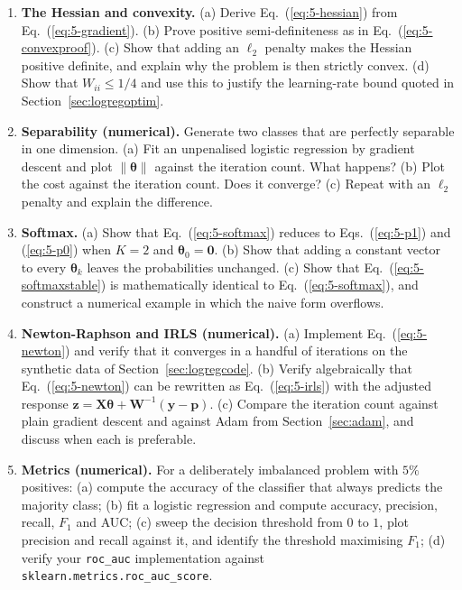 \begin{enumerate}
\item \textbf{The Hessian and convexity.}
  (a) Derive Eq.~(\ref{eq:5-hessian}) from Eq.~(\ref{eq:5-gradient}).
  (b) Prove positive semi-definiteness as in Eq.~(\ref{eq:5-convexproof}).
  (c) Show that adding an $\ell_2$ penalty makes the Hessian positive
      definite, and explain why the problem is then strictly convex.
  (d) Show that $W_{ii}\le 1/4$ and use this to justify the learning-rate
      bound quoted in Section~\ref{sec:logregoptim}.

\item \textbf{Separability (numerical).}
  Generate two classes that are perfectly separable in one dimension.
  (a) Fit an unpenalised logistic regression by gradient descent and plot
      $\|\bm{\theta}\|$ against the iteration count.  What happens?
  (b) Plot the cost against the iteration count.  Does it converge?
  (c) Repeat with an $\ell_2$ penalty and explain the difference.

\item \textbf{Softmax.}
  (a) Show that Eq.~(\ref{eq:5-softmax}) reduces to
      Eqs.~(\ref{eq:5-p1}) and (\ref{eq:5-p0}) when $K=2$ and
      $\bm{\theta}_0=\bm{0}$.
  (b) Show that adding a constant vector to every $\bm{\theta}_k$ leaves the
      probabilities unchanged.
  (c) Show that Eq.~(\ref{eq:5-softmaxstable}) is mathematically identical to
      Eq.~(\ref{eq:5-softmax}), and construct a numerical example in which the
      naive form overflows.

\item \textbf{Newton-Raphson and IRLS (numerical).}
  (a) Implement Eq.~(\ref{eq:5-newton}) and verify that it converges in a
      handful of iterations on the synthetic data of
      Section~\ref{sec:logregcode}.
  (b) Verify algebraically that Eq.~(\ref{eq:5-newton}) can be rewritten as
      Eq.~(\ref{eq:5-irls}) with the adjusted response
      $\bm{z}=\bm{X}\bm{\theta}+\bm{W}^{-1}(\bm{y}-\bm{p})$.
  (c) Compare the iteration count against plain gradient descent and against
      Adam from Section~\ref{sec:adam}, and discuss when each is preferable.

\item \textbf{Metrics (numerical).}
  For a deliberately imbalanced problem with $5\%$ positives:
  (a) compute the accuracy of the classifier that always predicts the majority
      class;
  (b) fit a logistic regression and compute accuracy, precision, recall,
      $F_1$ and AUC;
  (c) sweep the decision threshold from $0$ to $1$, plot precision and recall
      against it, and identify the threshold maximising $F_1$;
  (d) verify your \texttt{roc\_auc} implementation against
      \texttt{sklearn.metrics.roc\_auc\_score}.


\end{enumerate}
